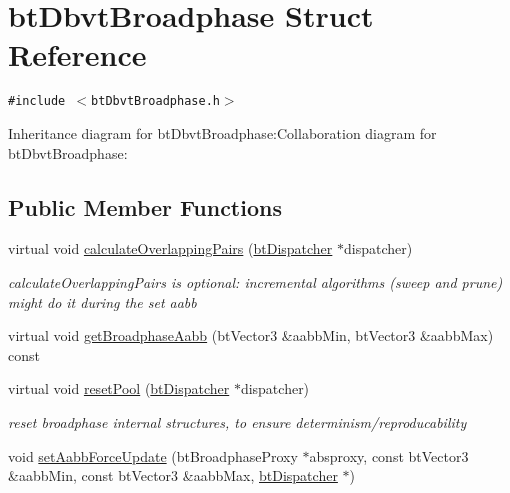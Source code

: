 \hypertarget{structbt_dbvt_broadphase}{
\section{btDbvtBroadphase Struct Reference}
\label{structbt_dbvt_broadphase}
}
{\tt \#include $<$btDbvtBroadphase.h$>$}

Inheritance diagram for btDbvtBroadphase:Collaboration diagram for btDbvtBroadphase:\subsection*{Public Member Functions}
\begin{CompactItemize}
\item 
\hypertarget{structbt_dbvt_broadphase_182741d147d9810758c886ce86fb03e6}{
virtual void \hyperlink{structbt_dbvt_broadphase_182741d147d9810758c886ce86fb03e6}{calculateOverlappingPairs} (\hyperlink{classbt_dispatcher}{btDispatcher} $\ast$dispatcher)}
\label{structbt_dbvt_broadphase_182741d147d9810758c886ce86fb03e6}

\begin{CompactList}\small\item\em calculateOverlappingPairs is optional: incremental algorithms (sweep and prune) might do it during the set aabb \item\end{CompactList}\item 
virtual void \hyperlink{structbt_dbvt_broadphase_32ab55b5ef2616d0cc039cd037c05d7f}{getBroadphaseAabb} (btVector3 \&aabbMin, btVector3 \&aabbMax) const 
\item 
\hypertarget{structbt_dbvt_broadphase_4d27a2ffb543aa23bb82fcf50ff25341}{
virtual void \hyperlink{structbt_dbvt_broadphase_4d27a2ffb543aa23bb82fcf50ff25341}{resetPool} (\hyperlink{classbt_dispatcher}{btDispatcher} $\ast$dispatcher)}
\label{structbt_dbvt_broadphase_4d27a2ffb543aa23bb82fcf50ff25341}

\begin{CompactList}\small\item\em reset broadphase internal structures, to ensure determinism/reproducability \item\end{CompactList}\item 
void \hyperlink{structbt_dbvt_broadphase_645dd617d0bbe7767859f424e2ee18c1}{setAabbForceUpdate} (btBroadphaseProxy $\ast$absproxy, const btVector3 \&aabbMin, const btVector3 \&aabbMax, \hyperlink{classbt_dispatcher}{btDispatcher} $\ast$)
\end{CompactItemize}


